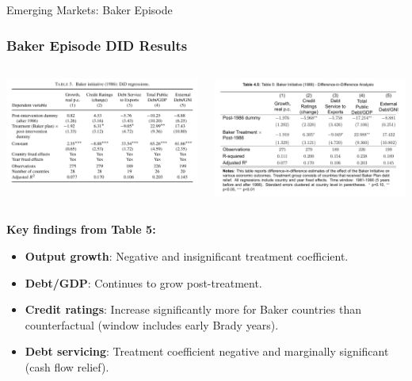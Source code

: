 \documentclass{beamer}
\begin{document}
\begin{frame}{Emerging Markets: Baker Episode}
  \frametitle{Baker Episode DID Results}
    \begin{columns}[T] %
    \begin{column}{0.45\textwidth}
      \centering
      \includegraphics[width=0.9\linewidth]{figures/tab5.png}
    \end{column}
    \begin{column}{0.45\textwidth}
      \centering
      \includegraphics[width=0.9\linewidth]{figures/tab5_rep.png}
    \end{column}
  \end{columns}
  \textbf{Key findings from Table 5:}
  \begin{itemize}
    \item \textbf{Output growth}: Negative and insignificant treatment coefficient.
    \item \textbf{Debt/GDP}: Continues to grow post-treatment.
    \item \textbf{Credit ratings}: \textcolor{green!70!black}{Increase significantly more} for Baker countries than counterfactual (window includes early Brady years).
    \item \textbf{Debt servicing}: Treatment coefficient negative and marginally significant (\textcolor{green!70!black}{cash flow relief}).
  \end{itemize}
\end{frame}
\end{document}
